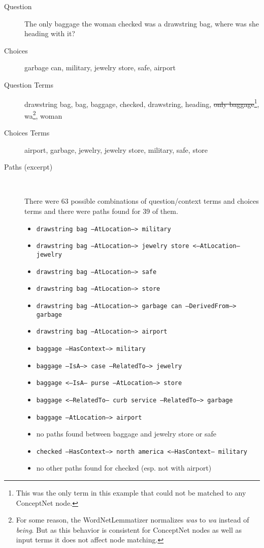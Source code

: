 \documentclass{article}
\begin{document}
\begin{description}
\item[Question] The only baggage the woman checked was a drawstring
bag, where was she heading with it?
\item[Choices] garbage can, military, jewelry store, safe, airport
\item[Question Terms] drawstring bag, bag, baggage, checked,
  drawstring, heading, \st{only baggage}\footnote{This was the only
    term in this example that could not be matched to any ConceptNet node.},
  wa\footnote{For some reason, the WordNetLemmatizer normalizes
    \emph{was} to \emph{wa} instead of \emph{being}. But as this behavior is
    consistent for ConceptNet nodes as well as input terms it does
    not affect node matching.}, woman
  
\item[Choices Terms] airport, garbage, jewelry, jewelry store,
  military, safe, store

  
\item[Paths (excerpt)] \,

  There were 63 possible combinations of question/context terms and choices
  terms and there were paths found for 39 of them.

  \begin{itemize}
  \item \texttt{drawstring bag --AtLocation--> military}
  \item \texttt{drawstring bag --AtLocation--> jewelry store
      <--AtLocation-- jewelry}
  \item \texttt{drawstring bag --AtLocation--> safe}
  \item \texttt{drawstring bag --AtLocation--> store}
  \item \texttt{drawstring bag --AtLocation--> garbage can
      --DerivedFrom--> garbage}
  \item \texttt{drawstring bag --AtLocation--> airport}
  \item \texttt{baggage --HasContext--> military}
  \item \texttt{baggage --IsA--> case --RelatedTo--> jewelry}
  \item \texttt{baggage <--IsA-- purse --AtLocation--> store}
  \item \texttt{baggage <--RelatedTo-- curb service --RelatedTo--> garbage}
  \item \texttt{baggage --AtLocation--> airport}
  \item no paths found between baggage and jewelry store or safe
  \item \texttt{checked --HasContext--> north america <--HasContext-- military}
  \item no other paths found for checked (esp. not with airport)

  \end{itemize}

\end{description}
\end{document}
